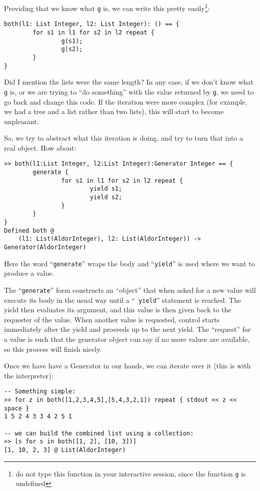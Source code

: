 \documentclass{article}
\begin{document}
Providing that we know what {\tt g} is, we can write this pretty
easily\footnote{do not type this function in your interactive session,
since the function {\tt g} is undefined}:
\begin{small}
\begin{verbatim}
both(l1: List Integer, l2: List Integer): () == {
        for s1 in l1 for s2 in l2 repeat {
                g(s1);
                g(s2);
        }
}
\end{verbatim}
\end{small}

Did I mention the lists were the same length?  In any case, if we
don't know what {\tt g} is, or we are trying to ``do something'' with
the value returned by {\tt g}, we need to go back and change this
code.  If the iteration were more complex (for example, we had a tree
and a list rather than two lists), this will start to become
unpleasant.

So, we try to abstract what this iteration is doing, and try to turn
that into a real object.  How about:
\begin{small}
\begin{verbatim}
>> both(l1:List Integer, l2:List Integer):Generator Integer == {
        generate {
                for s1 in l1 for s2 in l2 repeat {
                        yield s1;
                        yield s2;
                }
        }
}
Defined both @
    (l1: List(AldorInteger), l2: List(AldorInteger)) -> Generator(AldorInteger)
\end{verbatim}
\end{small}

Here the word ``{\tt generate}'' wraps the body and ``{\tt yield}'' is
used where we want to produce a value.

The ``{\tt generate}'' form constructs an ``object'' that when asked
for a new value will execute its body in the usual way until a ``{\tt
yield}'' statement is reached.  The yield then evaluates its argument,
and this value is then given back to the requester of the value.  When
another value is requested, control starts immediately after the yield
and proceeds up to the next yield.  The ``request'' for a value is
such that the generator object can say if no more values are
available, so this process will finish nicely.

Once we have have a Generator in our hands, we can iterate over it
(this is with the interpreter):
\begin{small}
\begin{verbatim}
-- Something simple:
>> for z in both([1,2,3,4,5],[5,4,3,2,1]) repeat { stdout << z << space }
1 5 2 4 3 3 4 2 5 1 

-- we can build the combined list using a collection:
>> [s for s in both([1, 2], [10, 3])]
[1, 10, 2, 3] @ List(AldorInteger)
\end{verbatim}
\end{small}
\end{document}
